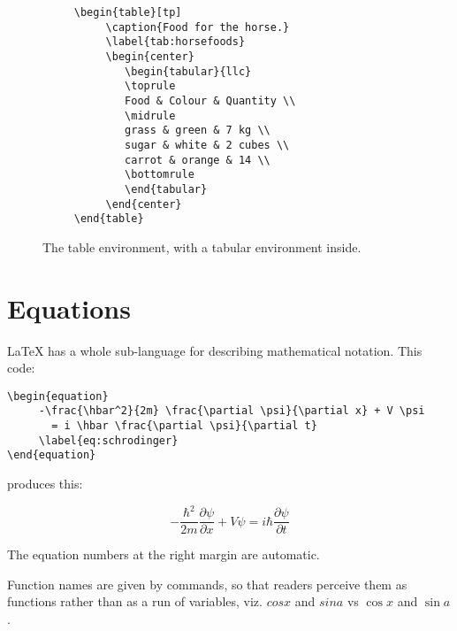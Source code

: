 \begin{figure}[tp]
\protect\begin{verbatim}
     \begin{table}[tp]
          \caption{Food for the horse.}
          \label{tab:horsefoods}
          \begin{center}
             \begin{tabular}{llc}
             \toprule
             Food & Colour & Quantity \\
             \midrule
             grass & green & 7 kg \\
             sugar & white & 2 cubes \\
             carrot & orange & 14 \\
             \bottomrule
             \end{tabular}
          \end{center}
     \end{table}
\end{verbatim}
\caption{The table environment, with a tabular environment inside.}
\label{fig:table}
\end{figure}

\section{Equations}

LaTeX has a whole sub-language for describing mathematical notation. This code:

\begin{verbatim}
\begin{equation}
     -\frac{\hbar^2}{2m} \frac{\partial \psi}{\partial x} + V \psi 
       = i \hbar \frac{\partial \psi}{\partial t}
     \label{eq:schrodinger}
\end{equation}
\end{verbatim}
produces this:

\begin{equation}
	-\frac{\hbar^2}{2m} \frac{\partial \psi}{\partial x} + V \psi = i \hbar \frac{\partial \psi}{\partial t}
	\label{eq:schrodinger}
\end{equation}

The equation numbers at the right margin are automatic.

Function names are given by commands, so that readers perceive them as functions rather than as a run of variables, viz. $cos x$ and $sin a$ vs $\cos x$ and $\sin a$.

